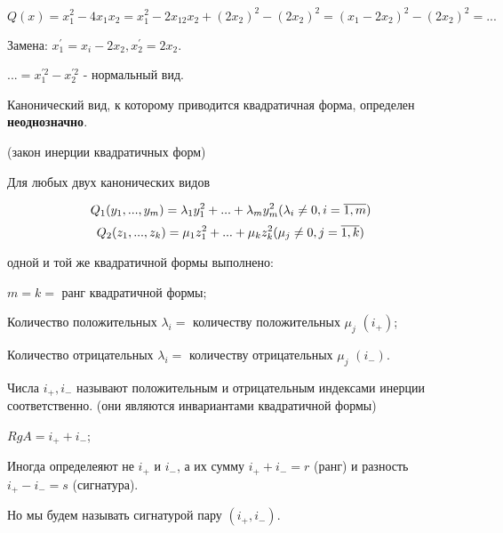 \documentclass[../main.tex]{subfiles}
\begin{document}
\void{} $Q(x) = x^2_1 - 4x_1x_2 = x^2_1 - 2x_12x_2 + (2x_2)^2-(2x_2)^2 =
(x_1-2x_2)^2 - (2x_2)^2 = ...$

Замена: $x^{'}_1 = x_i - 2x_2, x^{'}_2 = 2x_2$.

$... = x^{'2}_1 - x^{'2}_2$ - нормальный вид.

\void{} Канонический вид, к которому приводится квадратичная форма, определен
\textbf{неоднозначно}.

\void{} (закон инерции квадратичных форм)

Для любых двух канонических видов

$$ Q_1(y_1,...,y_m) = \lambda_1y_1^2 + ... + \lambda_m y^2_m  (\lambda_i\neq 0, i = \overline{1, m})$$
$$ Q_2(z_1,...,z_k) = \mu_1z_1^2 + ... + \mu_k z^2_k  (\mu_j\neq 0, j = \overline{1, k})$$

одной и той же квадратичной формы выполнено:

\void{} $m = k =$ ранг квадратичной формы;

\void{} Количество положительных $\lambda_i =$ количеству положительных $\mu_j$ $(i_{+})$;

\void{} Количество отрицательных $\lambda_i =$ количеству отрицательных $\mu_j$ $(i_{-})$.

\void Числа $i_{+}, i_{-}$ называют положительным и отрицательным индексами инерции соответственно.
(они являются инвариантами квадратичной формы)

\void{} $RgA = i_{+} + i_{-}$;

\void{} Иногда определеяют не $i_{+}$ и $i_{-}$, а их сумму
$i_{+} + i_{-} = r$ (ранг) и разность $i_{+} - i_{-} = s$ (сигнатура).

Но мы будем называть сигнатурой пару $(i_{+}, i_{-})$.
\end{document}

